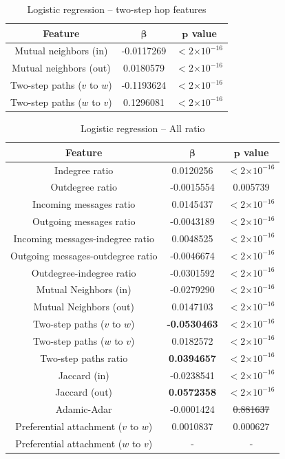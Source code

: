 \documentclass[conference]{IEEEtran}
\providecommand{\e}[1]{\ensuremath{\times 10^{#1}}}
\begin{document}
\begin{table}[!t]
\renewcommand{\arraystretch}{1.3}
\caption{Logistic regression -- two-step hop features}
\label{table_recresults_logrpath}
\centering
\begin{tabular}{|c||c|c|}
\hline
\bf{Feature} & $\mathbf{\beta}$ & $\mathbf{p}$ value \\
\hline
Mutual neighbors (in) & -0.0117269 & $< 2 \e{-16} $ \\
Mutual neighbors (out) & 0.0180579 & $< 2 \e{-16} $ \\
Two-step paths ($v$ to $w$) & -0.1193624 & $< 2 \e{-16} $ \\
Two-step paths ($w$ to $v$) & 0.1296081 & $< 2 \e{-16} $ \\
\hline
\end{tabular}
\end{table}

\begin{table}[!t]
\renewcommand{\arraystretch}{1.3}
\caption{Logistic regression -- All ratio}
\label{table_recresults_lograll2}
\centering
\begin{tabular}{|c||c|c|}
\hline
\bf{Feature} & $\mathbf{\beta}$ & $\mathbf{p}$ value \\
\hline
Indegree ratio     &    0.0120256  & $< 2 \e{-16} $\\
Outdegree ratio    &   -0.0015554  & 0.005739 \\
Incoming messages ratio    &    0.0145437  & $< 2 \e{-16} $\\
Outgoing messages ratio   &   -0.0043189  & $< 2 \e{-16} $\\
Incoming messages-indegree ratio   & 0.0048525   & $< 2 \e{-16} $ \\
Outgoing messages-outdegree ratio   & -0.0046674 & $< 2 \e{-16} $ \\
Outdegree-indegree ratio  &  -0.0301592  & $< 2 \e{-16} $\\
\hline
Mutual Neighbors (in) & -0.0279290  &$< 2 \e{-16} $\\
Mutual Neighbors (out) & 0.0147103  & $< 2 \e{-16} $\\
Two-step paths ($v$ to $w$)  &  \bf{-0.0530463}   & $< 2 \e{-16} $\\
Two-step paths ($w$ to $v$)   &    0.0182572   & $< 2 \e{-16} $\\
\hline
Two-step paths ratio  &   \bf{0.0394657} & $< 2 \e{-16} $\\
Jaccard (in) & -0.0238541 & $< 2 \e{-16} $\\
Jaccard (out) &   \bf{0.0572358}  & $< 2 \e{-16} $\\
Adamic-Adar  &    -0.0001424 & \sout{0.881637} \\
Preferential attachment ($v$ to $w$) & 0.0010837  & 0.000627 \\
Preferential attachment ($w$ to $v$)  &  - & -  \\
\hline
\end{tabular}
\end{table}
\end{document}
